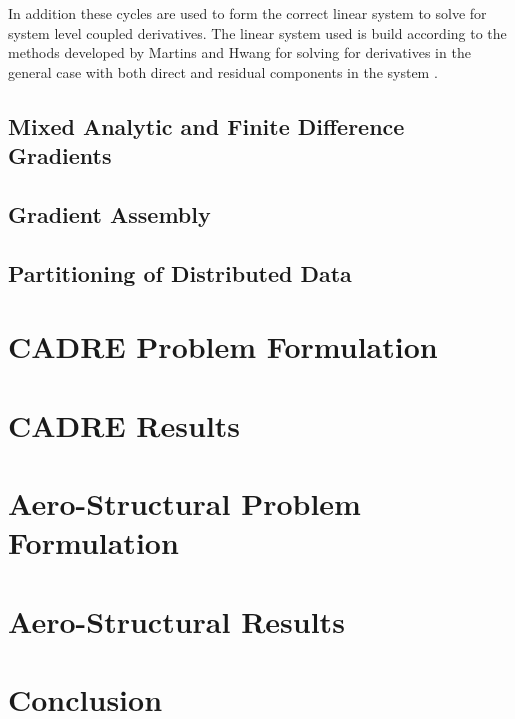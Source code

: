 \documentclass[]{aiaa-tc} %
\begin{document}
    In addition these cycles are used to form the correct linear system to solve for system level coupled 
    derivatives. The linear system used is build according to the methods developed by Martins and Hwang
    for solving for derivatives in the general case with both direct and residual 
    components in the system \cite{Martins2012}.

    \subsection{Mixed Analytic and Finite Difference Gradients}
    \subsection{Gradient Assembly}
    \subsection{Partitioning of Distributed Data}

  \section{CADRE Problem Formulation}

  \section{CADRE Results}

  \section{Aero-Structural Problem Formulation}

  \section{Aero-Structural Results}

  \section{Conclusion}
 
  
\end{document}
